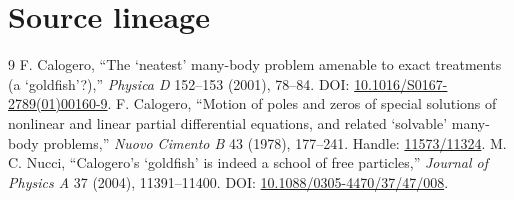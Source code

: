 \documentclass[10pt]{article}
\begin{document}
\section*{Source lineage}
\begin{thebibliography}{9}
 F. Calogero, ``The `neatest' many-body problem
amenable to exact treatments (a `goldfish'?),'' \emph{Physica D} 152--153
(2001), 78--84.
DOI: \href{https://doi.org/10.1016/S0167-2789(01)00160-9}{10.1016/S0167-2789(01)00160-9}.
 F. Calogero, ``Motion of poles and zeros of special
solutions of nonlinear and linear partial differential equations, and
related `solvable' many-body problems,'' \emph{Nuovo Cimento B} 43 (1978),
177--241. Handle: \href{http://hdl.handle.net/11573/11324}{11573/11324}.
 M. C. Nucci, ``Calogero's `goldfish' is indeed a school
of free particles,'' \emph{Journal of Physics A} 37 (2004), 11391--11400.
DOI: \href{https://doi.org/10.1088/0305-4470/37/47/008}{10.1088/0305-4470/37/47/008}.
\end{thebibliography}
\end{document}
